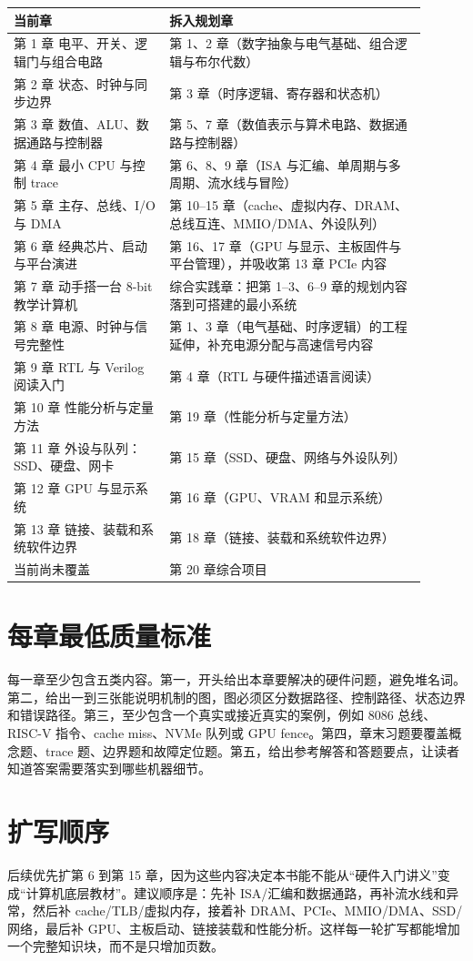 \begin{longtable}{L{0.34\linewidth}L{0.56\linewidth}}
\toprule
当前章 & 拆入规划章 \\
\midrule
第 1 章 电平、开关、逻辑门与组合电路 & 第 1、2 章（数字抽象与电气基础、组合逻辑与布尔代数） \\
第 2 章 状态、时钟与同步边界 & 第 3 章（时序逻辑、寄存器和状态机） \\
第 3 章 数值、ALU、数据通路与控制器 & 第 5、7 章（数值表示与算术电路、数据通路与控制器） \\
第 4 章 最小 CPU 与控制 trace & 第 6、8、9 章（ISA 与汇编、单周期与多周期、流水线与冒险） \\
第 5 章 主存、总线、I/O 与 DMA & 第 10–15 章（cache、虚拟内存、DRAM、总线互连、MMIO/DMA、外设队列） \\
第 6 章 经典芯片、启动与平台演进 & 第 16、17 章（GPU 与显示、主板固件与平台管理），并吸收第 13 章 PCIe 内容 \\
第 7 章 动手搭一台 8-bit 教学计算机 & 综合实践章：把第 1–3、6–9 章的规划内容落到可搭建的最小系统 \\
第 8 章 电源、时钟与信号完整性 & 第 1、3 章（电气基础、时序逻辑）的工程延伸，补充电源分配与高速信号内容 \\
第 9 章 RTL 与 Verilog 阅读入门 & 第 4 章（RTL 与硬件描述语言阅读） \\
第 10 章 性能分析与定量方法 & 第 19 章（性能分析与定量方法） \\
第 11 章 外设与队列：SSD、硬盘、网卡 & 第 15 章（SSD、硬盘、网络与外设队列） \\
第 12 章 GPU 与显示系统 & 第 16 章（GPU、VRAM 和显示系统） \\
第 13 章 链接、装载和系统软件边界 & 第 18 章（链接、装载和系统软件边界） \\
当前尚未覆盖 & 第 20 章综合项目 \\
\bottomrule
\end{longtable}

\section*{每章最低质量标准}

每一章至少包含五类内容。第一，开头给出本章要解决的硬件问题，避免堆名词。第二，给出一到三张能说明机制的图，图必须区分数据路径、控制路径、状态边界和错误路径。第三，至少包含一个真实或接近真实的案例，例如 8086 总线、RISC-V 指令、cache miss、NVMe 队列或 GPU fence。第四，章末习题要覆盖概念题、trace 题、边界题和故障定位题。第五，给出参考解答和答题要点，让读者知道答案需要落实到哪些机器细节。

\section*{扩写顺序}

后续优先扩第 6 到第 15 章，因为这些内容决定本书能不能从“硬件入门讲义”变成“计算机底层教材”。建议顺序是：先补 ISA/汇编和数据通路，再补流水线和异常，然后补 cache/TLB/虚拟内存，接着补 DRAM、PCIe、MMIO/DMA、SSD/网络，最后补 GPU、主板启动、链接装载和性能分析。这样每一轮扩写都能增加一个完整知识块，而不是只增加页数。
